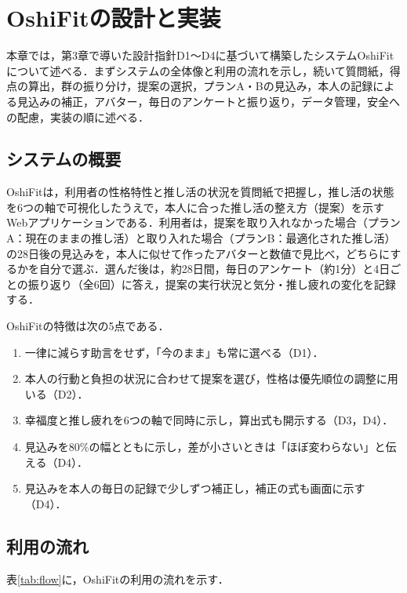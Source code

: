 \chapter{OshiFitの設計と実装}
本章では，第3章で導いた設計指針D1〜D4に基づいて構築したシステムOshiFitについて述べる．まずシステムの全体像と利用の流れを示し，続いて質問紙，得点の算出，群の振り分け，提案の選択，プランA・Bの見込み，本人の記録による見込みの補正，アバター，毎日のアンケートと振り返り，データ管理，安全への配慮，実装の順に述べる．

\section{システムの概要}
OshiFitは，利用者の性格特性と推し活の状況を質問紙で把握し，推し活の状態を6つの軸で可視化したうえで，本人に合った推し活の整え方（提案）を示すWebアプリケーションである．利用者は，提案を取り入れなかった場合（プランA：現在のままの推し活）と取り入れた場合（プランB：最適化された推し活）の28日後の見込みを，本人に似せて作ったアバターと数値で見比べ，どちらにするかを自分で選ぶ．選んだ後は，約28日間，毎日のアンケート（約1分）と4日ごとの振り返り（全6回）に答え，提案の実行状況と気分・推し疲れの変化を記録する．

OshiFitの特徴は次の5点である．
\begin{enumerate}
\item 一律に減らす助言をせず，「今のまま」も常に選べる（D1）．
\item 本人の行動と負担の状況に合わせて提案を選び，性格は優先順位の調整に用いる（D2）．
\item 幸福度と推し疲れを6つの軸で同時に示し，算出式も開示する（D3，D4）．
\item 見込みを80\%の幅とともに示し，差が小さいときは「ほぼ変わらない」と伝える（D4）．
\item 見込みを本人の毎日の記録で少しずつ補正し，補正の式も画面に示す（D4）．
\end{enumerate}

\section{利用の流れ}
表\ref{tab:flow}に，OshiFitの利用の流れを示す．

